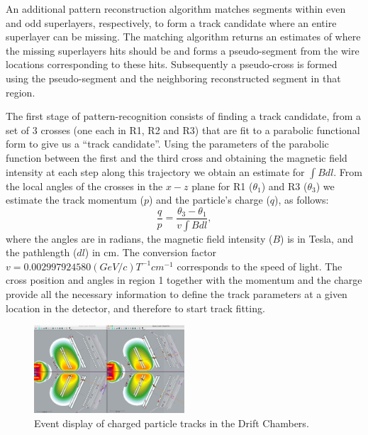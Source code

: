\documentclass[3p,times,twocolumn]{elsarticle}
\begin{document}
An additional  pattern reconstruction algorithm  matches segments within even and odd superlayers, respectively, to form
a track candidate where an entire superlayer can be missing.  The matching algorithm returns an estimates of where the missing
superlayers hits should be and forms a pseudo-segment from the wire locations corresponding to these hits.  Subsequently
a pseudo-cross is formed using the pseudo-segment and the neighboring reconstructed segment in that region.

The first stage of
pattern-recognition consists of finding a track candidate, from a set of 3 crosses (one each in R1, R2 and R3) that
are fit to a parabolic functional form to give us a ``track candidate''.
Using the parameters of the parabolic function between the first and the third cross and obtaining the magnetic field
intensity at each step along this trajectory we obtain an estimate for $\int B dl$.
From the local angles of the crosses in the $x-z$ plane for R1 ($\theta_1$) and R3 ($\theta_3$) we estimate the track momentum ($p$)
and the particle's charge ($q$),
as follows:
\begin{equation}\frac{q}{p} = \frac{\theta_3 - \theta_1}{v\int{B dl}},\end{equation} where the angles are in radians, the magnetic field
intensity ($B$) is in Tesla, and the pathlength ($dl$) in cm.
The conversion factor  $v = 0.002997924580 (GeV/c) T^{-1} cm^{-1}$  corresponds to the speed of light.
The cross position and angles in region 1 together with the
momentum and the charge provide all the necessary information to define the track parameters at a given location in the detector,
and therefore to start track fitting.

\begin{figure}[hbt]
\includegraphics[width=0.5\textwidth,natwidth=610,natheight=642]{pics/dcTrack3.png}
\caption{Event display of charged particle tracks in the Drift Chambers.
}
\label{fig:dcTracks}
\end{figure}
\end{document}
